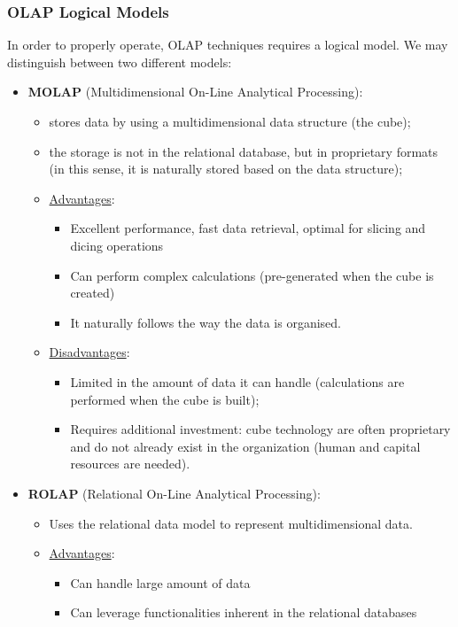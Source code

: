 \documentclass[10pt,a4paper]{article}
\begin{document}
\begin{justify}
\subsubsection{OLAP Logical Models}
In order to properly operate, OLAP techniques requires a logical model. We may distinguish between two different models:
\begin{itemize}
	\item \textbf{MOLAP} (Multidimensional On-Line Analytical Processing): 
	\begin{itemize}
		\item stores data by using a multidimensional data structure (the cube);
		\item the storage is not in the relational database, but in proprietary formats (in this sense, it is naturally stored based on the data structure);
		\item \uline{Advantages}:
		\begin{itemize}
			\item Excellent performance, fast data retrieval, optimal for slicing and dicing operations
			\item Can perform complex calculations (pre-generated when the cube is created)
			\item It naturally follows the way the data is organised.
		\end{itemize}
		\item \uline{Disadvantages}:
		\begin{itemize}
			\item Limited in the amount of data it can handle (calculations are performed when the cube is built);
			\item Requires additional investment: cube technology are often proprietary and do not already exist in the organization (human and capital resources are needed).
		\end{itemize}
	\end{itemize}		
	\item \textbf{ROLAP} (Relational On-Line Analytical Processing):
	\begin{itemize}
		\item Uses the relational data model to represent multidimensional data.
		\item \uline{Advantages}:
		\begin{itemize}
			\item Can handle large amount of data
			\item Can leverage functionalities inherent in the relational databases
		\end{itemize}

\end{itemize}
\end{itemize}
\end{justify}
\end{document}
